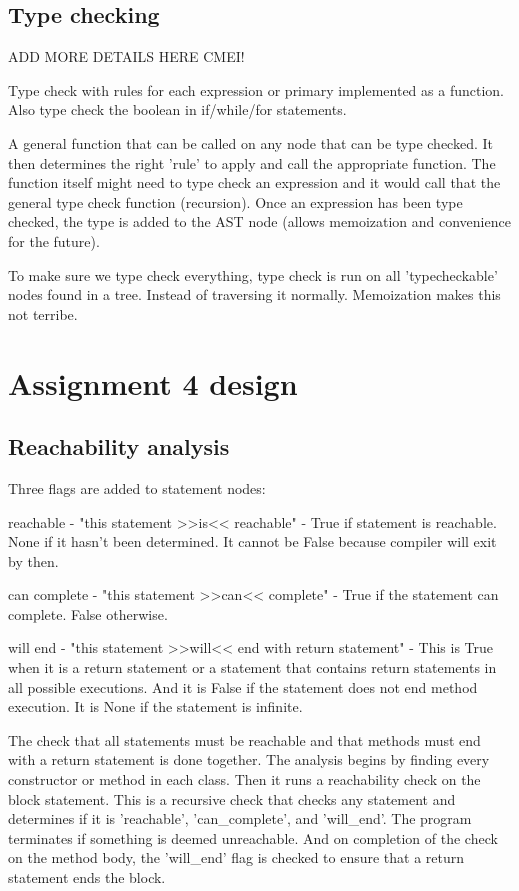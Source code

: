 \documentclass[12pt]{article}
\begin{document}
\subsection{Type checking}
ADD MORE DETAILS HERE CMEI!

Type check with rules for each expression or primary implemented as a function.
Also type check the boolean in if/while/for statements.

A general function that can be called on any node that can be type checked.
It then determines the right 'rule' to apply and call the appropriate function.
The function itself might need to type check an expression and it would
call that the general type check function (recursion). Once an expression has been
type checked, the type is added to the AST node (allows memoization and convenience
for the future).

To make sure we type check everything, type check is run on all 'typecheckable'
nodes found in a tree. Instead of traversing it normally. Memoization makes this
not terribe.

\section{Assignment 4 design}

\subsection{Reachability analysis}
Three flags are added to statement nodes:

reachable - "this statement >>is<< reachable" -
    True if statement is reachable. None if it hasn't been determined.
    It cannot be False because compiler will exit by then.

can complete - "this statement >>can<< complete" -
    True if the statement can complete. False otherwise.

will end - "this statement >>will<< end with return statement" -
    This is True when it is a return statement
    or a statement that contains return statements in all possible
    executions.
    And it is False if the statement does not end method execution.
    It is None if the statement is infinite.

The check that all statements must be reachable and that methods must end with
a return statement is done together.
The analysis begins by finding every constructor or method in each class.
Then it runs a reachability check on the block statement.
This is a recursive check that checks any statement and determines if it is
'reachable', 'can_complete', and 'will_end'.
The program terminates if something is deemed
unreachable. And on completion of the check on the method body, the 'will_end'
flag is checked to ensure that a return statement ends the block.
\end{document}
